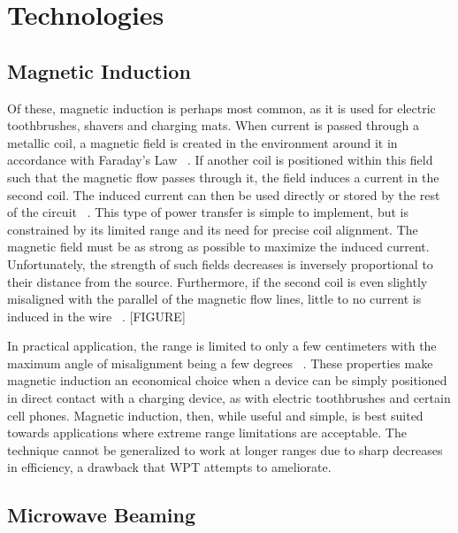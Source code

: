 \section{Technologies}
\label{sec:lit-review-tech}

\subsection{Magnetic Induction}
Of these, magnetic induction is perhaps most common, as it is used for electric toothbrushes, shavers and charging mats. When current is passed through a metallic coil, a magnetic field is created in the environment around it in accordance with Faraday's Law ~\cite{smith_waves_2010}. If another coil is positioned within this field such that the magnetic flow passes through it, the field induces a current in the second coil. The induced current can then be used directly or stored by the rest of the circuit ~\cite{smith_waves_2010}. This type of power transfer is simple to implement, but is constrained by its limited range and its need for precise coil alignment. The magnetic field must be as strong as possible to maximize the induced current. Unfortunately, the strength of such fields decreases is inversely proportional to their distance from the source. Furthermore, if the second coil is even slightly misaligned with the parallel of the magnetic flow lines, little to no current is induced in the wire ~\cite{griffiths_david_introduction_1999}.
[FIGURE]

In practical application, the range is limited to only a few centimeters with the maximum angle of misalignment being a few degrees ~\cite{butler_tour_2013}. These properties make magnetic induction an economical choice when a device can be simply positioned in direct contact with a charging device, as with electric toothbrushes and certain cell phones. Magnetic induction, then, while useful and simple, is best suited towards applications where extreme range limitations are acceptable. The technique cannot be generalized to work at longer ranges due to sharp decreases in efficiency, a drawback that WPT attempts to ameliorate.

\subsection{Microwave Beaming}

